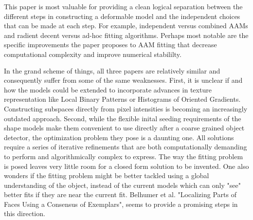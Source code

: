 \documentclass[12pt]{article}
\begin{document}
This paper is most valuable for providing a clean logical separation between the different steps in constructing a deformable model and the independent choices that can be made at each step.
For example, independent versus combined AAMs and radient decent versus ad-hoc fitting algorithms.
Perhaps most notable are the specific improvements the paper proposes to AAM fitting that decrease computational complexity and improve numerical stabililty.
\par
In the grand scheme of things, all three papers are relatively similar and consequently suffer from some of the same weaknesses.
First, it is unclear if and how the models could be extended to incorporate advances in texture representation like Local Binary Patterns or Histograms of Oriented Gradients.
Constructing subspaces directly from pixel intensities is becoming an increasingly outdated approach.
Second, while the flexible inital seeding requirements of the shape models make them convenient to use directly after a coarse grained object detector, the optimization problem they pose is a daunting one.
All solutions require a series of iterative refinements that are both computationally demanding to perform and algorithmically complex to express.
The way the fitting problem is posed leaves very little room for a closed form solution to be invented.
One also wonders if the fitting problem might be better tackled using a global understanding of the object, instead of the current models which can only "see" better fits if they are near the current fit.
Belhumer et al. "Localizing Parts of Faces Using a Consensus of Exemplars", seems to provide a promising steps in this direction.

 
\end{document}

